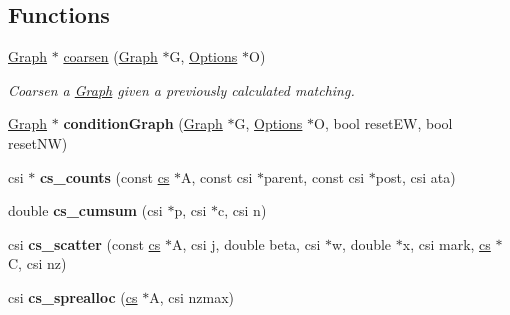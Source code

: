 \subsection*{Functions}
\begin{DoxyCompactItemize}
\item 
\hyperlink{class_mongoose_1_1_graph}{Graph} $\ast$ \hyperlink{namespace_mongoose_a449a68ce1571bc656fe05abd1fc6bbc8}{coarsen} (\hyperlink{class_mongoose_1_1_graph}{Graph} $\ast$G, \hyperlink{struct_mongoose_1_1_options}{Options} $\ast$O)
\begin{DoxyCompactList}\small\item\em Coarsen a \hyperlink{class_mongoose_1_1_graph}{Graph} given a previously calculated matching. \end{DoxyCompactList}\item 
\hypertarget{namespace_mongoose_a678a1f81adbafc8dcdde0fb1ce2cc44f}{}\label{namespace_mongoose_a678a1f81adbafc8dcdde0fb1ce2cc44f} 
\hyperlink{class_mongoose_1_1_graph}{Graph} $\ast$ {\bfseries condition\+Graph} (\hyperlink{class_mongoose_1_1_graph}{Graph} $\ast$G, \hyperlink{struct_mongoose_1_1_options}{Options} $\ast$O, bool reset\+EW, bool reset\+NW)
\item 
\hypertarget{namespace_mongoose_acb29e4bf4084eda121225ece4ce31cf6}{}\label{namespace_mongoose_acb29e4bf4084eda121225ece4ce31cf6} 
csi $\ast$ {\bfseries cs\+\_\+counts} (const \hyperlink{struct_mongoose_1_1cs__sparse}{cs} $\ast$A, const csi $\ast$parent, const csi $\ast$post, csi ata)
\item 
\hypertarget{namespace_mongoose_a23d4d5e0800aad2fc913da64ab134905}{}\label{namespace_mongoose_a23d4d5e0800aad2fc913da64ab134905} 
double {\bfseries cs\+\_\+cumsum} (csi $\ast$p, csi $\ast$c, csi n)
\item 
\hypertarget{namespace_mongoose_ad49815602060d8a608d27023c146d576}{}\label{namespace_mongoose_ad49815602060d8a608d27023c146d576} 
csi {\bfseries cs\+\_\+scatter} (const \hyperlink{struct_mongoose_1_1cs__sparse}{cs} $\ast$A, csi j, double beta, csi $\ast$w, double $\ast$x, csi mark, \hyperlink{struct_mongoose_1_1cs__sparse}{cs} $\ast$C, csi nz)
\item 
\hypertarget{namespace_mongoose_ae481bc1af8affa90b40d463ea4b3b395}{}\label{namespace_mongoose_ae481bc1af8affa90b40d463ea4b3b395} 
csi {\bfseries cs\+\_\+sprealloc} (\hyperlink{struct_mongoose_1_1cs__sparse}{cs} $\ast$A, csi nzmax)
\item 
\hypertarget{namespace_mongoose_a0ec8f329559f55565f8dd8f7f34e0d47}{}\label{namespace_mongoose_a0ec8f329559f55565f8dd8f7f34e0d47} 

\end{DoxyCompactItemize}
